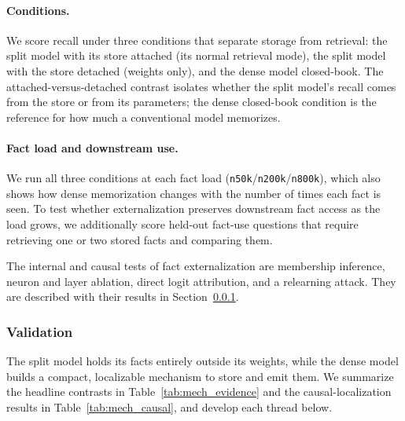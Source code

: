 \documentclass{article}
\begin{document}
\paragraph{Conditions.} We score recall under three conditions that separate storage from retrieval: the split model with its store attached (its normal retrieval mode), the split model with the store detached (weights only), and the dense model closed-book. The attached-versus-detached contrast isolates whether the split model's recall comes from the store or from its parameters; the dense closed-book condition is the reference for how much a conventional model memorizes.

\paragraph{Fact load and downstream use.} We run all three conditions at each fact load (\texttt{n50k}/\texttt{n200k}/\texttt{n800k}), which also shows how dense memorization changes with the number of times each fact is seen. To test whether externalization preserves downstream fact access as the load grows, we additionally score held-out fact-use questions that require retrieving one or two stored facts and comparing them.

The internal and causal tests of fact externalization are membership inference, neuron and layer ablation, direct logit attribution, and a relearning attack. They are described with their results in Section~\ref{sec:mech}.


\subsubsection{Validation}

\label{sec:mech}

The split model holds its facts entirely outside its weights, while the dense model builds a compact, localizable mechanism to store and emit them. We summarize the headline contrasts in Table~\ref{tab:mech_evidence} and the causal-localization results in Table~\ref{tab:mech_causal}, and develop each thread below. 
\end{document}
